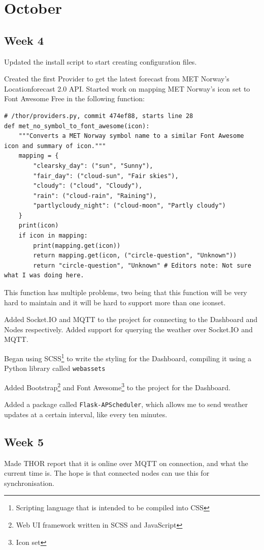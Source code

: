 \documentclass{report}
\begin{document}
	\chapter{October}
	\section{Week 4}
	Updated the install script to start creating configuration files.
	
	Created the first Provider to get the latest forecast from MET Norway's Locationforecast 2.0 API. Started work on mapping MET Norway's icon set to Font Awesome Free in the following function:
	
	\begin{lstlisting}
# /thor/providers.py, commit 474ef88, starts line 28
def met_no_symbol_to_font_awesome(icon):
	"""Converts a MET Norway symbol name to a similar Font Awesome icon and summary of icon."""
	mapping = {
		"clearsky_day": ("sun", "Sunny"),
		"fair_day": ("cloud-sun", "Fair skies"),
		"cloudy": ("cloud", "Cloudy"),
		"rain": ("cloud-rain", "Raining"),
		"partlycloudy_night": ("cloud-moon", "Partly cloudy")
	}
	print(icon)
	if icon in mapping:
		print(mapping.get(icon))
		return mapping.get(icon, ("circle-question", "Unknown"))
		return "circle-question", "Unknown" # Editors note: Not sure what I was doing here.
	\end{lstlisting}
	
	This function has multiple problems, two being that this function will be very hard to maintain and it will be hard to support more than one iconset.
		
	Added Socket.IO and MQTT to the project for connecting to the Dashboard and Nodes respectively. Added support for querying the weather over Socket.IO and MQTT.
	
	Began using SCSS\footnote{Scripting language that is intended to be compiled into CSS} to write the styling for the Dashboard, compiling it using a Python library called \texttt{webassets}
	
	Added Bootstrap\footnote{Web UI framework written in SCSS and JavaScript} and Font Awesome\footnote{Icon set} to the project for the Dashboard.
	
	Added a package called \texttt{Flask-APScheduler}, which allows me to send weather updates at a certain interval, like every ten minutes.
	
	\section{Week 5}
	Made THOR report that it is online over MQTT on connection, and what the current time is. The hope is that connected nodes can use this for synchronisation.
	
\end{document}
